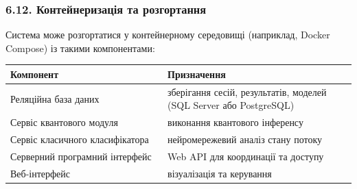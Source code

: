 \documentclass[12pt,a4paper]{article}
\begin{document}
\subsubsection{6.12. Контейнеризація та розгортання}\label{ux43aux43eux43dux442ux435ux439ux43dux435ux440ux438ux437ux430ux446ux456ux44f-ux442ux430-ux440ux43eux437ux433ux43eux440ux442ux430ux43dux43dux44f}



Система може розгортатися у контейнерному середовищі (наприклад, Docker Compose) із такими компонентами:



{\def\LTcaptype{none} %

\begin{longtable}[]{@{}

  >{\raggedright\arraybackslash}p{0.4583\linewidth}

  >{\raggedright\arraybackslash}p{0.5417\linewidth}@{}}

\toprule\noalign{}

\begin{minipage}[b]{\linewidth}\raggedright

Компонент

\end{minipage} & \begin{minipage}[b]{\linewidth}\raggedright

Призначення

\end{minipage} \\

\midrule\noalign{}

\endhead

\bottomrule\noalign{}

\endlastfoot

Реляційна база даних & зберігання сесій, результатів, моделей (SQL Server або PostgreSQL) \\

Сервіс квантового модуля & виконання квантового інференсу \\

Сервіс класичного класифікатора & нейромережевий аналіз стану потоку \\

Серверний програмний інтерфейс & Web API для координації та доступу \\

Веб-інтерфейс & візуалізація та керування \\

\end{longtable}

}
\end{document}
